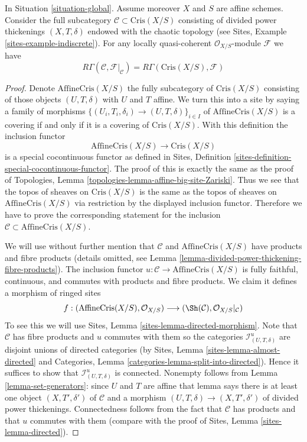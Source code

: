 \begin{lemma}
\label{lemma-compare}
In Situation \ref{situation-global}.
Assume moreover $X$ and $S$ are affine schemes.
Consider the full subcategory $\mathcal{C} \subset \text{Cris}(X/S)$
consisting of divided power thickenings $(X, T, \delta)$
endowed with the chaotic topology (see
Sites, Example \ref{sites-example-indiscrete}).
For any locally quasi-coherent $\mathcal{O}_{X/S}$-module $\mathcal{F}$
we have
$$
R\Gamma(\mathcal{C}, \mathcal{F}|_\mathcal{C}) =
R\Gamma(\text{Cris}(X/S), \mathcal{F})
$$
\end{lemma}

\begin{proof}
Denote $\text{AffineCris}(X/S)$ the fully subcategory of $\text{Cris}(X/S)$
consisting of those objects $(U, T, \delta)$ with $U$ and $T$ affine.
We turn this into a site by saying a family of morphisms
$\{(U_i, T_i, \delta_i) \to (U, T, \delta)\}_{i \in I}$ of
$\text{AffineCris}(X/S)$ is a covering if and only if it is a covering
of $\text{Cris}(X/S)$. With this definition the inclusion functor
$$
\text{AffineCris}(X/S) \longrightarrow \text{Cris}(X/S)
$$
is a special cocontinuous functor as defined in
Sites, Definition \ref{sites-definition-special-cocontinuous-functor}.
The proof of this is exactly the same as the proof of
Topologies, Lemma \ref{topologies-lemma-affine-big-site-Zariski}.
Thus we see that the topos of sheaves on $\text{Cris}(X/S)$
is the same as the topos of sheaves on $\text{AffineCris}(X/S)$
via restriction by the displayed inclusion functor.
Therefore we have to prove the corresponding statement for the
inclusion $\mathcal{C} \subset \text{AffineCris}(X/S)$.

\medskip\noindent
We will use without further mention that $\mathcal{C}$ and
$\text{AffineCris}(X/S)$ have products and fibre products
(details omitted, see
Lemma \ref{lemma-divided-power-thickening-fibre-products}).
The inclusion functor $u : \mathcal{C} \to \text{AffineCris}(X/S)$
is fully faithful, continuous, and commutes with products and fibre products.
We claim it defines a morphism of ringed sites
$$
f :
(\text{AffineCris}(X/S), \mathcal{O}_{X/S})
\longrightarrow
(\Sh(\mathcal{C}), \mathcal{O}_{X/S}|_\mathcal{C})
$$
To see this we will use Sites, Lemma \ref{sites-lemma-directed-morphism}.
Note that $\mathcal{C}$ has fibre products and $u$ commutes with them
so the categories $\mathcal{I}^u_{(U, T, \delta)}$ are disjoint unions
of directed categories (by Sites, Lemma \ref{sites-lemma-almost-directed} and
Categories, Lemma \ref{categories-lemma-split-into-directed}). Hence it
suffices to show that $\mathcal{I}^u_{(U, T, \delta)}$ is connected.
Nonempty follows from Lemma \ref{lemma-set-generators}: since $U$ and $T$
are affine that lemma says there is at least one object
$(X, T', \delta')$ of $\mathcal{C}$ and a morphism
$(U, T, \delta) \to (X, T', \delta')$ of divided power thickenings.
Connectedness follows from the fact that $\mathcal{C}$ has products
and that $u$ commutes with them (compare with the proof of
Sites, Lemma \ref{sites-lemma-directed}).


\end{proof}
